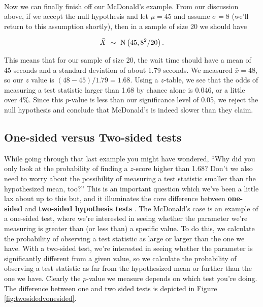 \ \\



Now \ex we can finally finish off our McDonald's example. From our discussion above, if we accept the null hypothesis and let $\mu=45$ and assume $\sigma=8$ (we'll return to this assumption shortly), then in a sample of size 20 we should have

\begin{equation*}

\bar{X}\ \sim\ {\rm N}\left(45,8^{2}/20\right).

\end{equation*}

This means that for our sample of size 20, the wait time should have a mean of 45 seconds and a standard deviation of about 1.79 seconds. We measured $\bar{x}=48$, so our $z$ value is $\left(48-45\right)/1.79=1.68$. Using a $z$-table, we see that the odds of measuring a test statistic larger than 1.68 by chance alone is 0.046, or a little over 4\%.  Since this $p$-value is less than our significance level of 0.05, we reject the null hypothesis and conclude that McDonald's is indeed slower than they claim.





\subsection{One-sided versus Two-sided tests}



While going through that last example you might have wondered, ``Why did you only look at the probability of finding a $z$-score higher than 1.68?  Don't we also need to worry about the possibility of measuring a test statistic smaller than the hypothesized mean, too?'' This is an important question which we've been a little lax about up to this but, and it illuminates the core difference between \textbf{one-sided} and \textbf{two-sided hypothesis tests} . The McDonald's case is an example of a one-sided test, where we're interested in seeing whether the parameter we're measuring is greater than (or less than) a specific value. To do this, we calculate the probability of observing a test statistic as large or larger than the one we have. With a two-sided test, we're interested in seeing whether the parameter is significantly different from a given value, so we calculate the probability of observing a test statistic as far from the hypothesized mean or further than the one we have. Clearly the $p$-value we measure depends on which test you're doing. The difference between one and two sided tests is depicted in Figure \ref{fig:twosidedvonesided}.



